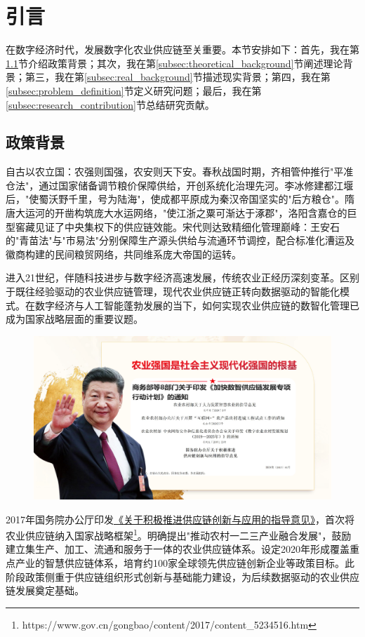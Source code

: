 \documentclass[lang=cn,12pt,a4paper]{elegantpaper}
\begin{document}
\section{引言}
\label{sec:introduction}
在数字经济时代，发展数字化农业供应链至关重要。本节安排如下：首先，我在第\ref{subsec:policy_background}节介绍政策背景；其次，我在第\ref{subsec:theoretical_background}节阐述理论背景；第三，我在第\ref{subsec:real_background}节描述现实背景；第四，我在第\ref{subsec:problem_definition}节定义研究问题；最后，我在第\ref{subsec:research_contribution}节总结研究贡献。

\subsection{政策背景}
\label{subsec:policy_background}
自古以农立国：农强则国强，农安则天下安。春秋战国时期，齐相管仲推行"平准仓法"，通过国家储备调节粮价保障供给，开创系统化治理先河。李冰修建都江堰后，"使蜀沃野千里，号为陆海"，使成都平原成为秦汉帝国坚实的"后方粮仓"。隋唐大运河的开凿构筑庞大水运网络，"使江浙之粟可渐达于涿郡"，洛阳含嘉仓的巨型窖藏见证了中央集权下的供应链效能。宋代则达致精细化管理巅峰：王安石的"青苗法"与"市易法"分别保障生产源头供给与流通环节调控，配合标准化漕运及徽商构建的民间粮贸网络，共同维系庞大帝国的运转。

进入21世纪，伴随科技进步与数字经济高速发展，传统农业正经历深刻变革。区别于既往经验驱动的农业供应链管理，现代农业供应链正转向数据驱动的智能化模式。在数字经济与人工智能蓬勃发展的当下，如何实现农业供应链的数智化管理已成为国家战略层面的重要议题。
\begin{figure}
    \centering
  \includegraphics[width=\linewidth]{policy.pdf}
\end{figure}
2017年国务院办公厅印发\href{https://www.gov.cn/gongbao/content/2017/content_5234516.htm}{《关于积极推进供应链创新与应用的指导意见》}，首次将农业供应链纳入国家战略框架\footnote{https://www.gov.cn/gongbao/content/2017/content\_5234516.htm}。明确提出"推动农村一二三产业融合发展"，鼓励建立集生产、加工、流通和服务于一体的农业供应链体系。设定2020年形成覆盖重点产业的智慧供应链体系，培育约100家全球领先供应链创新企业等政策目标。此阶段政策侧重于供应链组织形式创新与基础能力建设，为后续数据驱动的农业供应链发展奠定基础。
\end{document}
